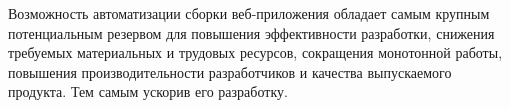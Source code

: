 Возможность  автоматизации сборки веб-приложения обладает самым крупным потенциальным резервом для повышения эффективности разработки, снижения требуемых материальных и трудовых ресурсов, сокращения монотонной работы, повышения производительности разработчиков и качества выпускаемого продукта. Тем самым ускорив его разработку.\par




\clearpage